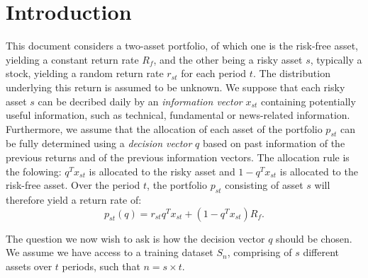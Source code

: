 \section{Introduction}
\label{sec:intro}

This document considers a two-asset portfolio, of which one is the risk-free asset,
yielding a constant return rate $R_f$, and the other being a risky asset $s$, typically a
stock, yielding a random return rate $r_{st}$ for each period $t$. The distribution
underlying this return is assumed to be unknown. We suppose that each risky asset $s$ can
be decribed daily by an \emph{information vector} $x_{st}$ containing potentially useful
information, such as technical, fundamental or news-related information. Furthermore, we
assume that the allocation of each asset of the portfolio $p_{st}$ can be fully determined
using a \emph{decision vector} $q$ based on past information of the previous returns and
of the previous information vectors. The allocation rule is the folowing: $q^Tx_{st}$ is
allocated to the risky asset and $1-q^Tx_{st}$ is allocated to the risk-free asset. Over
the period $t$, the portfolio $p_{st}$ consisting of asset $s$ will therefore yield a
return rate of:
\begin{equation}
  p_{st}(q) = r_{st}q^Tx_{st} + (1-q^Tx_{st})R_f.
\end{equation}

The question we now wish to ask is how the decision vector $q$ should be chosen. We assume
we have access to a training dataset $S_n$, comprising of $s$ different assets over
$t$%
periods, such that
$n = s\times t$. 
